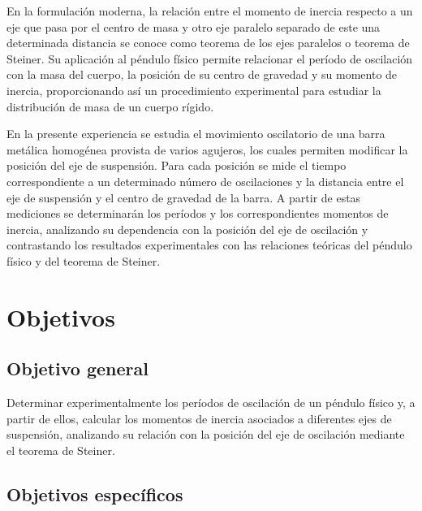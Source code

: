 \documentclass[11pt,a4paper]{article}
\begin{document}
En la formulación moderna, la relación entre el momento de inercia respecto
a un eje que pasa por el centro de masa y otro eje paralelo separado de
este una determinada distancia se conoce como teorema de los ejes paralelos
o teorema de Steiner. Su aplicación al péndulo físico permite relacionar
el período de oscilación con la masa del cuerpo, la posición de su centro
de gravedad y su momento de inercia, proporcionando así un procedimiento
experimental para estudiar la distribución de masa de un cuerpo rígido.

En la presente experiencia se estudia el movimiento oscilatorio de una
barra metálica homogénea provista de varios agujeros, los cuales permiten
modificar la posición del eje de suspensión. Para cada posición se mide
el tiempo correspondiente a un determinado número de oscilaciones y la
distancia entre el eje de suspensión y el centro de gravedad de la barra.
A partir de estas mediciones se determinarán los períodos y los
correspondientes momentos de inercia, analizando su dependencia con la
posición del eje de oscilación y contrastando los resultados experimentales
con las relaciones teóricas del péndulo físico y del teorema de Steiner.

\newpage

\section{Objetivos}

\subsection{Objetivo general}

Determinar experimentalmente los períodos de oscilación de un péndulo
físico y, a partir de ellos, calcular los momentos de inercia asociados
a diferentes ejes de suspensión, analizando su relación con la posición
del eje de oscilación mediante el teorema de Steiner.

\subsection{Objetivos específicos}
\end{document}
